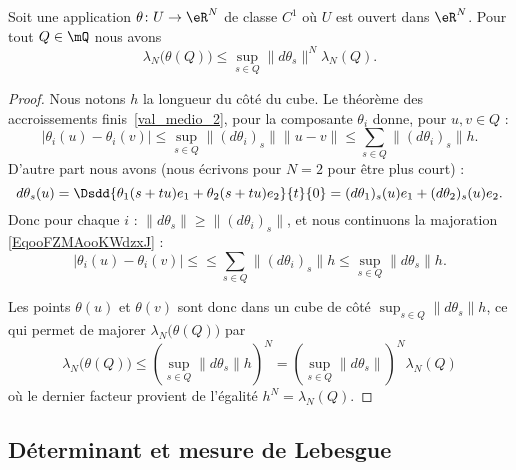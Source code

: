 \begin{lemma}      \label{LemooJCEDooBRyjRg}
    Soit une application \( \theta\colon U\to \eR^N\) de classe \( C^1\) où \( U\) est ouvert dans \( \eR^N\). Pour tout \( Q\in\mQ\) nous avons
    \begin{equation}
        \lambda_N\big( \theta(Q) \big)\leq\sup_{s\in Q}\| d\theta_s \|^N\lambda_N(Q).
    \end{equation}
\end{lemma}

\begin{proof}
    Nous notons \( h\) la longueur du côté du cube. Le théorème des accroissements finis~\ref{val_medio_2}, pour la composante \( \theta_i\) donne, pour \( u,v\in Q\) :
    \begin{equation}        \label{EqooFZMAooKWdzxJ}
        \big|  \theta_i(u)-\theta_i(v) \big|\leq\sup_{s\in Q}\| (d\theta_i)_s \|\| u-v \|\leq \sum_{s\in Q}\| (d\theta_i)_s \|h.
    \end{equation}
    D'autre part nous avons (nous écrivons pour \( N=2\) pour être plus court) :
    \begin{equation}
        d\theta_s(u)=\Dsdd{ \theta_1(s+tu)e_1+\theta_2(s+tu)e_2 }{t}{0}=(d\theta_1)_s(u)e_1+(d\theta_2)_s(u)e_2.
    \end{equation}
    Donc pour chaque \( i\) : \( \| d\theta_s \|\geq \| (d\theta_i)_s \|\), et nous continuons la majoration \eqref{EqooFZMAooKWdzxJ} :
    \begin{equation}
        \big|  \theta_i(u)-\theta_i(v) \big|\leq\leq \sum_{s\in Q}\| (d\theta_i)_s \|h\leq \sup_{s\in Q}\| d\theta_s \|h.
    \end{equation}

    Les points \( \theta(u)\) et \( \theta(v)\) sont donc dans un cube de côté \( \sup_{s\in Q}\| d\theta_s \|h\), ce qui permet de majorer \( \lambda_N\big( \theta(Q) \big)\) par
    \begin{equation}
        \lambda_N\big( \theta(Q) \big)\leq \left( \sup_{s\in Q}\| d\theta_s \|h \right)^N=\left( \sup_{s\in Q}\| d\theta_s \| \right)^N\lambda_N(Q)
    \end{equation}
    où le dernier facteur provient de l'égalité \( h^N=\lambda_N(Q)\).
\end{proof}

\subsection{Déterminant et mesure de Lebesgue}

